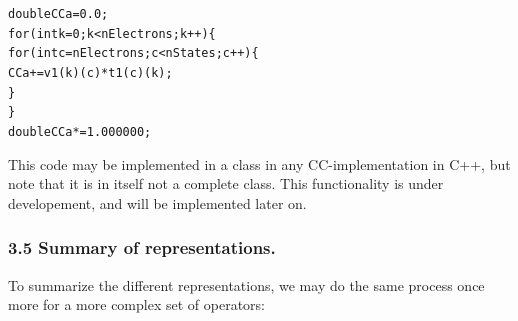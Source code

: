 \documentclass[letterpaper,10pt,english]{/Users/kinealicegulbrandsen/anaconda/lib/python2.7/site-packages/sphinx/texinputs/sphinxhowto}
\newenvironment{InvisibleVerbatim}
        {\begin{mdframed}[leftmargin=0.1\linewidth,innerleftmargin=3pt,innerrightmargin=3pt, userdefinedwidth=1\linewidth, linewidth=0pt, linecolor=white, usetwoside=false]}
        {\end{mdframed}}
\begin{document}
            
                \begin{InvisibleVerbatim}
                \vspace{-0.5\baselineskip}
\begin{alltt}
double CCa = 0.0;
for(int k = 0; k < nElectrons; k ++)\{
    for(int c = nElectrons; c < nStates; c ++)\{
        CCa += v1(k)(c)*t1(c)(k);
    \}
\}
double CCa *= 1.000000;

\end{alltt}

            \end{InvisibleVerbatim}
            
        
    
This code may be implemented in a class in any CC-implementation in C++,
but note that it is in itself not a complete class. This functionality
is under developement, and will be implemented later on.\subsubsection{3.5 Summary of
representations.}\label{summary-of-representations.}

To summarize the different representations, we may do the same process
once more for a more complex set of operators:

\end{document}

